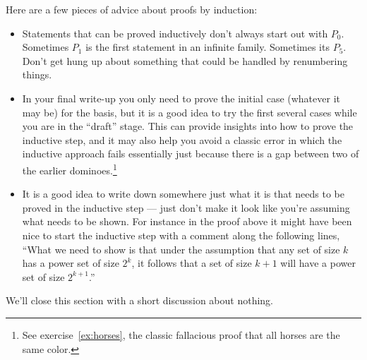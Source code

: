 Here are a few pieces
of advice about proofs by induction:

\begin{itemize}
\item Statements that can be proved inductively don't always start out with 
$P_0$.  Sometimes $P_1$ is the first statement in an infinite family.
Sometimes its $P_5$.  Don't get hung up about something that could be
handled by renumbering things.  
\item In your final write-up you only need to prove the initial case
(whatever it may be) for the basis, but it is a good idea to try 
the first several cases while you are in the ``draft'' stage.  This
can provide insights into how to prove the inductive step, and it may
also help you avoid a classic error in which the inductive approach fails
essentially just because there is a gap between two of the earlier 
dominoes.\footnote{See exercise~\ref{ex:horses}, the classic fallacious proof that all horses are the same color.}
\item It is a good idea to write down somewhere just what it is that
needs to be proved in the inductive step --- just don't make it look like 
you're assuming what needs to be shown.  For instance in the proof above
it might have been nice to start the inductive step with a comment along
the following lines, ``What we need to show is that under the assumption
that any set of size $k$ has a power set of size $2^k$, it follows that
a set of size $k+1$ will have a power set of size $2^{k+1}$.'' 
\end{itemize}
\medskip

We'll close this section with a short discussion about nothing.



